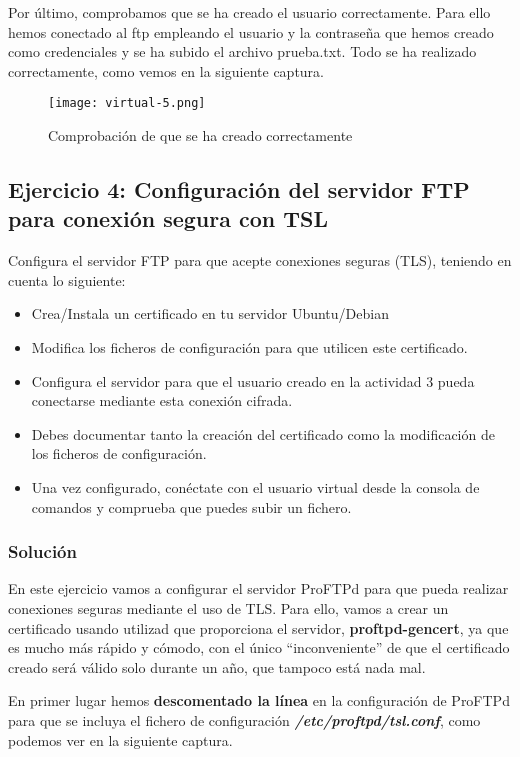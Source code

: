 Por último, comprobamos que se ha creado el usuario correctamente. Para ello hemos conectado al ftp empleando el usuario y la contraseña que hemos creado como credenciales y se ha subido el archivo prueba.txt. Todo se ha realizado correctamente, como vemos en la siguiente captura.

\begin{figure}[H]
    \centering
    \texttt{[image: virtual-5.png]}
    \caption{Comprobación de que se ha creado correctamente}
\end{figure}

\subsection{Ejercicio 4: Configuración del servidor FTP para conexión segura con TSL}
Configura el servidor FTP para que acepte conexiones seguras (TLS), teniendo en cuenta lo siguiente:

\begin{itemize}
    \item Crea/Instala un certificado en tu servidor Ubuntu/Debian
    \item Modifica los ficheros de configuración para que utilicen este certificado.
    \item Configura el servidor para que el usuario creado en la actividad 3 pueda conectarse mediante esta conexión cifrada.
    \item Debes documentar tanto la creación del certificado como la modificación de los ficheros de configuración.
    \item Una vez configurado, conéctate con el usuario virtual desde la consola de comandos y comprueba que puedes subir un fichero.
\end{itemize}

\subsubsection{Solución}
En este ejercicio vamos a configurar el servidor ProFTPd para que pueda realizar conexiones seguras mediante el uso de TLS.  Para ello, vamos a crear un certificado usando utilizad que proporciona el servidor, \textbf{proftpd-gencert}, ya que es mucho más rápido y cómodo, con el único ``inconveniente'' de que el certificado creado será válido solo durante un año, que tampoco está nada mal.

En primer lugar hemos \textbf{descomentado la línea} en la configuración de ProFTPd para que se incluya el fichero de configuración
\textbf{\textit{/etc/proftpd/tsl.conf}}, como podemos ver en la siguiente captura.

